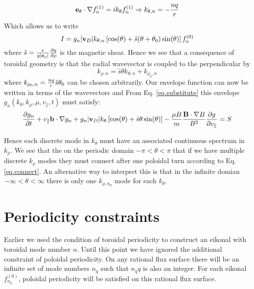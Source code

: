 \documentclass[a4paper,11pt]{article}
\begin{document}
\begin{equation}
 {\bf e}_\theta \cdot \nabla f_n^{(1)} = ik_\theta f_n^{(1)} \Rightarrow k_{\theta,n} = - {nq \over r}
\end{equation}
Which allows us to write
\begin{equation}
 I = g_n|{\bf v}_D|k_{\theta,n} \left[\cos(\theta)+{\hat s}(\theta+\theta_0) \sin(\theta)\right]f_n^{(0)} 
\end{equation}
where ${\hat s}={r \over q |{\bf e}_\rho|}{\partial q \over \partial \rho}$ is the magnetic shear.  Hence we see that a consequence of toroidal geometry is that the radial wavevector is coupled to the perpendicular by
\begin{equation}
 k_{\rho,n}={\hat s}\theta k_{\theta,n}+k_{\rho_0,n}
\label{eq.connect}
\end{equation}
where $k_{\rho_0,n}={nq \over r}{\hat s}\theta_0$ can be chosen arbitrarily.  Our envelope function can now be written in terms of the wavevectors and From Eq. \ref{eq.substitute} this envelope $g_n(k_\theta,k_\rho,\mu,v_\parallel,t)$ must satisfy:
\begin{equation}
{\partial g_n \over \partial t} + v_\parallel{\bf b}\cdot\nabla g_n + g_n|{\bf v}_D|k_\theta \left[\cos(\theta)+{\hat s}\theta \sin(\theta)\right]-{\mu B \over m}{{\bf B}\cdot \nabla B \over B^2}{\partial g \over \partial v_\parallel}=S
\end{equation}

Hence each discrete mode in $k_\theta$ must have an associated continuous spectrum in $k_\rho$. We see that the on the periodic domain $-\pi < \theta < \pi$ that if we have multiple discrete $k_{\rho}$ modes they must connect after one poloidal turn according to Eq. \ref{eq.connect}. An alternative way to interpret this is that in the infinite domian $-\infty < \theta < \infty$ there is only one $k_{\rho,n_p}$ mode for each $k_\theta$.

\section{Periodicity constraints}
Earlier we used the condition of toroidal periodicity to construct an eikonal with toroidal mode number $n$. Until this point we have ignored the additional constraint of poloidal periodicity. On any rational flux surface there will be an infinite set of mode numbers $n_q$ such that $n_q q$ is also an integer.  For each eikonal $f_{n_q}^{(0)}$, poloidal periodicity will be satisfied on this rational flux surface. 
\end{document}
